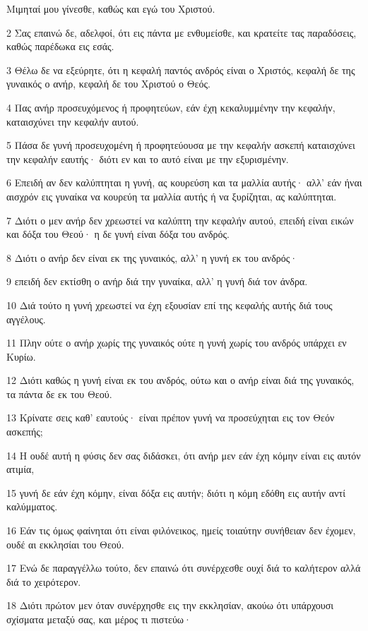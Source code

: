 \par Μιμηταί μου γίνεσθε, καθώς και εγώ του Χριστού.
\par 2 Σας επαινώ δε, αδελφοί, ότι εις πάντα με ενθυμείσθε, και κρατείτε τας παραδόσεις, καθώς παρέδωκα εις εσάς.
\par 3 Θέλω δε να εξεύρητε, ότι η κεφαλή παντός ανδρός είναι ο Χριστός, κεφαλή δε της γυναικός ο ανήρ, κεφαλή δε του Χριστού ο Θεός.
\par 4 Πας ανήρ προσευχόμενος ή προφητεύων, εάν έχη κεκαλυμμένην την κεφαλήν, καταισχύνει την κεφαλήν αυτού.
\par 5 Πάσα δε γυνή προσευχομένη ή προφητεύουσα με την κεφαλήν ασκεπή καταισχύνει την κεφαλήν εαυτής· διότι εν και το αυτό είναι με την εξυρισμένην.
\par 6 Επειδή αν δεν καλύπτηται η γυνή, ας κουρεύση και τα μαλλία αυτής· αλλ' εάν ήναι αισχρόν εις γυναίκα να κουρεύη τα μαλλία αυτής ή να ξυρίζηται, ας καλύπτηται.
\par 7 Διότι ο μεν ανήρ δεν χρεωστεί να καλύπτη την κεφαλήν αυτού, επειδή είναι εικών και δόξα του Θεού· η δε γυνή είναι δόξα του ανδρός.
\par 8 Διότι ο ανήρ δεν είναι εκ της γυναικός, αλλ' η γυνή εκ του ανδρός·
\par 9 επειδή δεν εκτίσθη ο ανήρ διά την γυναίκα, αλλ' η γυνή διά τον άνδρα.
\par 10 Διά τούτο η γυνή χρεωστεί να έχη εξουσίαν επί της κεφαλής αυτής διά τους αγγέλους.
\par 11 Πλην ούτε ο ανήρ χωρίς της γυναικός ούτε η γυνή χωρίς του ανδρός υπάρχει εν Κυρίω.
\par 12 Διότι καθώς η γυνή είναι εκ του ανδρός, ούτω και ο ανήρ είναι διά της γυναικός, τα πάντα δε εκ του Θεού.
\par 13 Κρίνατε σεις καθ' εαυτούς· είναι πρέπον γυνή να προσεύχηται εις τον Θεόν ασκεπής;
\par 14 Η ουδέ αυτή η φύσις δεν σας διδάσκει, ότι ανήρ μεν εάν έχη κόμην είναι εις αυτόν ατιμία,
\par 15 γυνή δε εάν έχη κόμην, είναι δόξα εις αυτήν; διότι η κόμη εδόθη εις αυτήν αντί καλύμματος.
\par 16 Εάν τις όμως φαίνηται ότι είναι φιλόνεικος, ημείς τοιαύτην συνήθειαν δεν έχομεν, ουδέ αι εκκλησίαι του Θεού.
\par 17 Ενώ δε παραγγέλλω τούτο, δεν επαινώ ότι συνέρχεσθε ουχί διά το καλήτερον αλλά διά το χειρότερον.
\par 18 Διότι πρώτον μεν όταν συνέρχησθε εις την εκκλησίαν, ακούω ότι υπάρχουσι σχίσματα μεταξύ σας, και μέρος τι πιστεύω·
